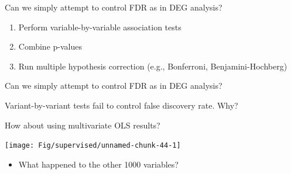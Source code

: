 \documentclass[
  ignorenonframetext,
  aspectratio=169]{beamer}
\providecommand{\tightlist}{%
  \setlength{\itemsep}{0pt}\setlength{\parskip}{0pt}}
\begin{document}
\begin{frame}{Can we simply attempt to control FDR as in DEG analysis?}
\protect\hypertarget{can-we-simply-attempt-to-control-fdr-as-in-deg-analysis}{}
\Large

\begin{enumerate}
\item
  Perform variable-by-variable association tests
\item
  Combine p-values
\item
  Run multiple hypothesis correction (e.g., Bonferroni,
  Benjamini-Hochberg)
\end{enumerate}
\end{frame}

\begin{frame}{Can we simply attempt to control FDR as in DEG analysis?}
\protect\hypertarget{can-we-simply-attempt-to-control-fdr-as-in-deg-analysis-1}{}
\scriptsize

\normalsize

\scriptsize


\normalsize

\scriptsize


\normalsize

Variant-by-variant tests fail to control false discovery rate. Why?
\end{frame}

\begin{frame}{How about using multivariate OLS results?}
\protect\hypertarget{how-about-using-multivariate-ols-results}{}
\scriptsize

\begin{center}\texttt{[image: Fig/supervised/unnamed-chunk-44-1]} \end{center}

\normalsize

\begin{itemize}
\tightlist
\item
  What happened to the other 1000 variables?
\end{itemize}
\end{frame}
\end{document}
